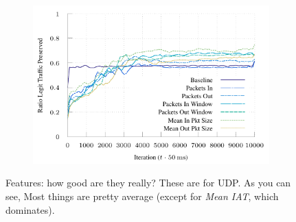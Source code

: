 \documentclass[conference, letterpaper, 10pt, times]{IEEEtran}
\begin{document}
\begin{figure}
\begin{subfigure}{0.32\linewidth}
	\end{subfigure}
	\begin{subfigure}{0.32\linewidth}
		\includegraphics[width=\linewidth]{../plots/ftprep-good-3}
	\end{subfigure}
	\caption{
		Features: how good are they really? These are for UDP. As you can see, Most things are pretty average (except for \emph{Mean IAT}, which dominates).
	\label{fig:udp-feature-plots}
}
\end{figure}

\end{document}
